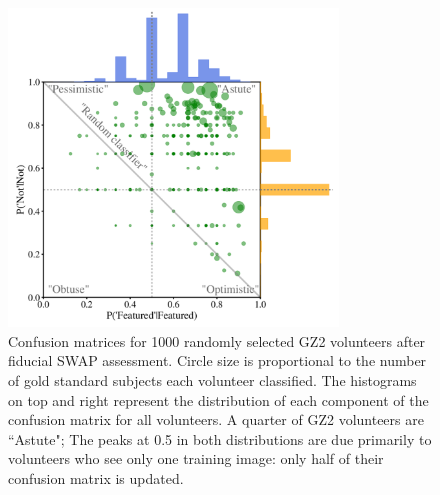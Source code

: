 \begin{figure}[t!]
\includegraphics[width=3.45in]{Figures/human_machine/f2.pdf}
\caption[Galaxy Zoo volunteer confusion matrices achieved through SWAP.]{Confusion matrices for 1000 randomly selected GZ2 volunteers after fiducial SWAP assessment. Circle size is proportional to the number of gold standard subjects each volunteer classified. The histograms on top and right represent the distribution of each component of the confusion matrix for all volunteers.  A quarter of GZ2 volunteers are ``Astute";  The peaks at 0.5 in both distributions are due primarily to volunteers who see only one training image: only half of their confusion matrix is updated. \label{fig: volunteer training}}
\end{figure}


